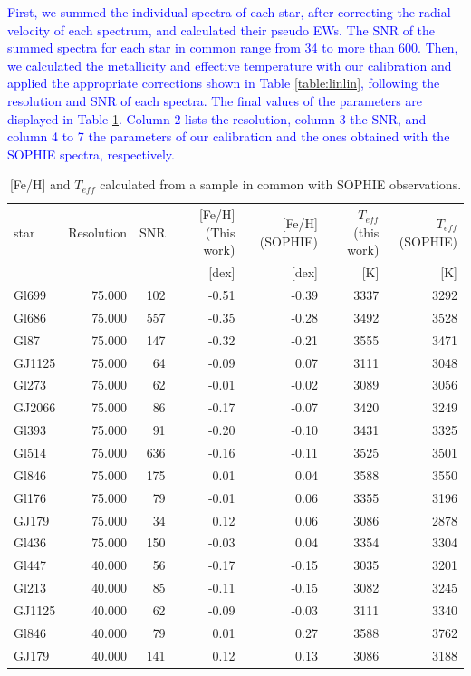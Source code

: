 \documentclass{aa}
\begin{document}
\textcolor{blue}{First, we summed the individual spectra of each star, after correcting the radial velocity of each spectrum, and calculated their pseudo EWs. The SNR of the summed spectra for each star in common range from 34 to more than 600. Then, we calculated the metallicity and effective temperature with our calibration and applied the appropriate corrections shown in Table \ref{table:linlin}, following the resolution and SNR of each spectra. The final values of the parameters are displayed in Table \ref{table:sophie}. Column 2 lists the resolution, column 3 the SNR, and column 4 to 7 the parameters of our calibration and the ones obtained with the SOPHIE spectra, respectively.} %

\begin{table}[h]
\centering
\caption[]{[Fe/H] and $T_{eff}$ calculated from a sample in common with SOPHIE observations.}
\label{table:sophie}
\begin{center}
\begin{tabular}{l r r r r r r}
\hline
\hline
star & Resolution & SNR & [Fe/H] (This work) & [Fe/H] (SOPHIE) & $T_{eff}$ (this work) & $T_{eff}$ (SOPHIE) \\
     &            &     &  [dex] & [dex]       &  [K] & [K]       \\
\hline
Gl699 & 75.000 & 102 & -0.51 & -0.39 & 3337 & 3292 \\
Gl686 & 75.000 & 557 & -0.35 & -0.28 & 3492 & 3528 \\
Gl87 & 75.000 & 147 & -0.32 & -0.21 & 3555 & 3471 \\
GJ1125 & 75.000 & 64 & -0.09 & 0.07 & 3111 & 3048 \\
Gl273 & 75.000 & 62 & -0.01 & -0.02 & 3089 & 3056 \\
GJ2066 & 75.000 & 86 & -0.17 & -0.07 & 3420 & 3249 \\
Gl393 & 75.000 & 91 & -0.20 & -0.10 & 3431 & 3325 \\
Gl514 & 75.000 & 636 & -0.16 & -0.11 & 3525 & 3501 \\
Gl846 & 75.000 & 175 & 0.01 & 0.04 & 3588 & 3550 \\
Gl176 & 75.000 & 79 & -0.01 & 0.06 & 3355 & 3196 \\
GJ179 & 75.000 & 34 & 0.12 & 0.06 & 3086 & 2878 \\
Gl436 & 75.000 & 150 & -0.03 & 0.04 & 3354 & 3304 \\
Gl447 & 40.000 & 56 & -0.17 & -0.15 & 3035 & 3201 \\
Gl213 & 40.000 & 85 & -0.11 & -0.15 & 3082 & 3245 \\
GJ1125 & 40.000 & 62 & -0.09 & -0.03 & 3111 & 3340 \\
Gl846 & 40.000 & 79 & 0.01 & 0.27 & 3588 & 3762 \\
GJ179 & 40.000 & 141 & 0.12 & 0.13 & 3086 & 3188 \\
\hline
\end{tabular}
\end{center}
\end{table}
\end{document}
